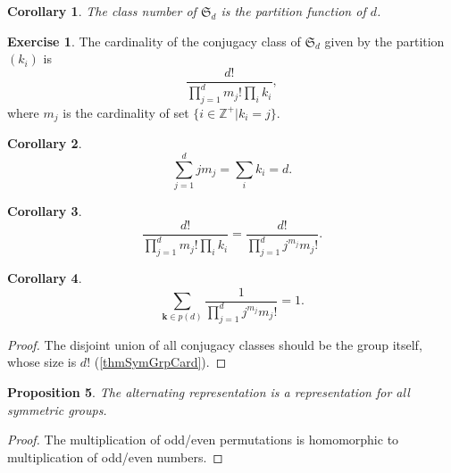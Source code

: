 \documentclass[12pt, letterpaper]{article}
\newcommand{\inte}{\mathbb{Z}}
\newtheorem{prop}{Proposition}[section]
\newtheorem{cor}[prop]{Corollary}
\theoremstyle{definition}
\theoremstyle{remark}
\theoremstyle{definition}
\newtheorem{exe}{Exercise}[section]
\theoremstyle{plain}
\numberwithin{equation}{section}
\begin{document}
	\begin{cor}
		The class number of $\mathfrak{S}_d$ is the partition function of $d$.
	\end{cor}
	\begin{exe}
		The cardinality of the conjugacy class of $\mathfrak{S}_d$
		given by the partition $(k_i)$ is
		\[\frac{d!}{\prod_{j=1}^d m_j! \prod_i k_i},\]
		where $m_j$ is the cardinality of set $\{i\in\inte^+|k_i=j\}$.
	\end{exe}
	\begin{cor}
		\[\sum_{j=1}^{d}jm_j=\sum_{i}k_i=d.\]
	\end{cor}
	\begin{cor}
		\[\frac{d!}{\prod_{j=1}^d m_j! \prod_i k_i}=\frac{d!}{\prod_{j=1}^d j^{m_j}m_j! }.\]
	\end{cor}
	\begin{cor}\label{corEqjmjmj!}
		\[\sum_{\mathbf{k}\in p(d)}\frac{1}{\prod_{j=1}^d j^{m_j}m_j! }=1.\]
	\end{cor}
	\begin{proof}
		The disjoint union of all conjugacy classes should be the group itself,
		whose size is $d!$ (\autoref{thmSymGrpCard}).
	\end{proof}

	\begin{prop}
		The alternating representation is a representation for all symmetric groups.
	\end{prop}
	\begin{proof}
		The multiplication of odd/even permutations is homomorphic to multiplication of odd/even numbers.
	\end{proof}
\end{document}
